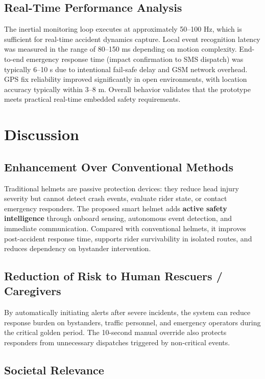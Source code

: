 \documentclass[10pt,a4paper]{article}
\begin{document}
\subsection{Real-Time Performance Analysis}

The inertial monitoring loop executes at approximately 50--100 Hz, which is sufficient for real-time accident dynamics capture. Local event recognition latency was measured in the range of 80--150 ms depending on motion complexity. End-to-end emergency response time (impact confirmation to SMS dispatch) was typically 6--10 s due to intentional fail-safe delay and GSM network overhead. GPS fix reliability improved significantly in open environments, with location accuracy typically within 3--8 m. Overall behavior validates that the prototype meets practical real-time embedded safety requirements.

\section{Discussion}

\subsection{Enhancement Over Conventional Methods}

Traditional helmets are passive protection devices: they reduce head injury severity but cannot detect crash events, evaluate rider state, or contact emergency responders. The proposed smart helmet adds \textbf{active safety intelligence} through onboard sensing, autonomous event detection, and immediate communication. Compared with conventional helmets, it improves post-accident response time, supports rider survivability in isolated routes, and reduces dependency on bystander intervention.

\subsection{Reduction of Risk to Human Rescuers / Caregivers}

By automatically initiating alerts after severe incidents, the system can reduce response burden on bystanders, traffic personnel, and emergency operators during the critical golden period. The 10-second manual override also protects responders from unnecessary dispatches triggered by non-critical events.

\subsection{Societal Relevance}
\end{document}
